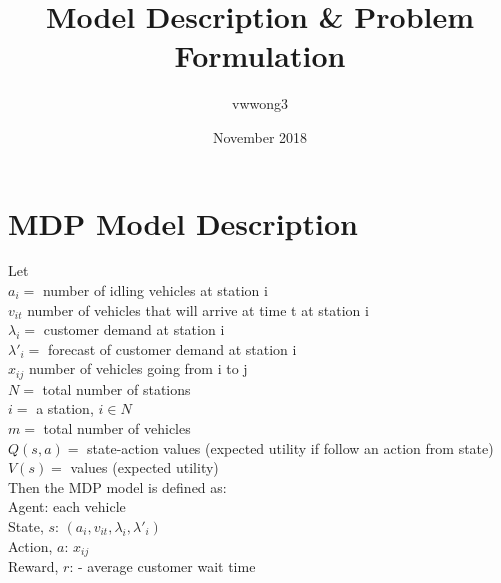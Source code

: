 \documentclass{article}
\title{Model Description & Problem Formulation}
\author{vwwong3 }
\date{November 2018}
\begin{document}
\maketitle

\section{MDP Model Description}
Let\\
$a_i = $ number of idling vehicles at station i\\
$v_{it}$ number of vehicles that will arrive at time t at station i\\
$\lambda_i =$ customer demand at station i \\
$\lambda'_i =$ forecast of customer demand at station i \\
$x_{ij}$ number of vehicles going from i to j\\
$N = $ total number of stations \\
$i = $ a station, $i \in N$\\
$m = $ total number of vehicles \\
$Q(s,a) = $ state-action values (expected utility if follow an action from state) \\
$ V(s) = $ values (expected utility) \\

Then the MDP model is defined as: \\
Agent: each vehicle\\
State, $s$: ${(a_i,v_{it},\lambda_i,\lambda'_i)}$\\
Action, $a$: ${x_{ij}}$\\
Reward, $r$: - average customer wait time \\ 
\end{document}

